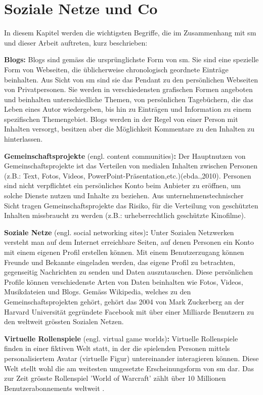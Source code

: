 \section{Soziale Netze und Co}\label{sec.sn}
In diesem Kapitel werden die wichtigsten Begriffe, die im Zusammenhang mit \gls{sm} und dieser Arbeit auftreten, kurz beschrieben:\par  
\textbf{Blogs:} Blogs sind gemäss  die ursprünglichste Form von \gls{sm}. Sie sind eine spezielle Form von Webseiten, die üblicherweise chronologisch geordnete Einträge beinhalten. Aus Sicht von \gls{sm} sind sie das Pendant zu den persönlichen Webseiten von Privatpersonen. Sie werden in verschiedensten grafischen Formen angeboten und beinhalten unterschiedliche Themen, von persönlichen Tagebüchern, die das Leben eines Autor wiedergeben, bis hin zu Einträgen und Information zu einem spezifischen Themengebiet. Blogs werden in der Regel von einer Person mit Inhalten versorgt, besitzen aber die Möglichkeit Kommentare zu den Inhalten zu hinterlassen. \par 
\textbf{Gemeinschaftsprojekte} (engl. content communities)\textbf{:} Der Hauptnutzen von Gemeinschaftsprojekte ist das Verteilen von medialen Inhalten zwischen Personen (z.B.: Text, Fotos, Videos, PowerPoint-Präsentation,etc.)(ebda.,2010). Personen sind nicht verpflichtet ein persönliches Konto beim Anbieter zu eröffnen, um solche Dienste nutzen und Inhalte zu beziehen. Aus unternehmenstechnischer Sicht tragen Gemeinschaftsprojekte das Risiko, für die Verteilung von geschützten Inhalten missbraucht zu werden (z.B.: urheberrechtlich geschützte Kinofilme). \par 
\textbf{Soziale Netze} (engl. social networking sites)\textbf{:} Unter Sozialen Netzwerken versteht man auf dem Internet erreichbare Seiten, auf denen Personen ein Konto mit einem eigenen Profil erstellen können. Mit einem Benutzerzugang können Freunde und Bekannte eingeladen werden, das eigene Profil zu betrachten, gegenseitig Nachrichten zu senden und Daten auszutauschen. Diese persönlichen Profile können verschiedenste Arten von Daten beinhalten wie Fotos, Videos, Musikdateien und Blogs. Gemäss Wikipedia, welches zu den Gemeinschaftsprojekten gehört, gehört das 2004 von Mark Zuckerberg an der Harvard Universität gegründete Facebook mit über einer Milliarde Benutzern \cite{Facebook:2012} zu den weltweit grössten Sozialen Netzen.\par 
\textbf{Virtuelle Rollenspiele} (engl. virtual game worlds)\textbf{:} Virtuelle Rollenspiele finden in einer fiktiven Welt statt, in der die spielenden Personen mittels personalisiertem Avatar (virtuelle Figur) untereinander interagieren können. Diese Welt stellt wohl die am weitesten umgesetzte Erscheinungsform von \gls{sm} dar. Das zur Zeit grösste Rollenspiel 'World of Warcraft' zählt über 10 Millionen Benutzerabonnements weltweit \cite{Blizzard:2012}.\par 
